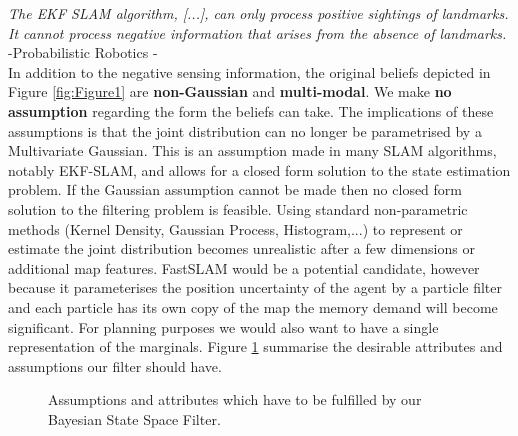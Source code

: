 {\quote \textit{The EKF SLAM algorithm, [...], can only process positive sightings of landmarks. It cannot process negative information
that arises from the absence of landmarks. } -Probabilistic Robotics \cite[p.313]{Thrun_Burgard_Fox_2005}-}\\[0.01cm]

In addition to the negative sensing information, the original beliefs depicted in Figure \ref{fig:Figure1} are \textbf{non-Gaussian}
and \textbf{multi-modal}. We make \textbf{no assumption} regarding the form the beliefs can take. The implications of these assumptions
is that the joint distribution can no longer be parametrised by a Multivariate Gaussian. 
This is an assumption made in many SLAM algorithms, notably EKF-SLAM, and allows for a closed form solution to the state estimation problem. If the Gaussian assumption 
cannot be made then no closed form solution to the filtering problem is feasible. 
Using standard non-parametric methods (Kernel Density, Gaussian Process, Histogram,...) to represent or estimate the joint distribution becomes
unrealistic after a few dimensions or additional map features. 
FastSLAM would be a potential candidate, however because it parameterises the position uncertainty of the agent by a particle filter and each
particle has its own copy of the map the memory demand will become significant.  For planning purposes we would also want to have a 
single representation of the marginals. Figure \ref{fig:ch5_assmuptions} summarise the desirable attributes and assumptions our filter should 
have.

\begin{figure}
\centering
{}%
\caption{Assumptions and attributes which have to be fulfilled by our Bayesian State Space Filter. }
 \label{fig:ch5_assmuptions}
\end{figure}

